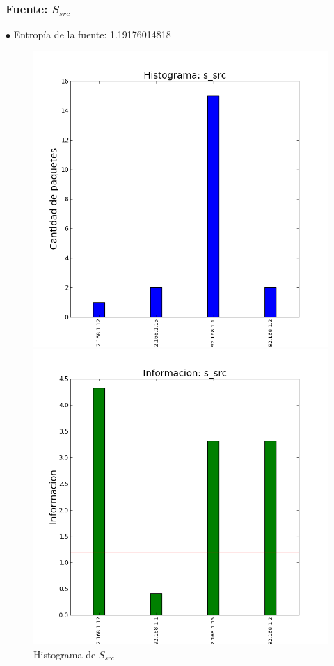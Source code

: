 \documentclass[10pt, a4paper]{article}
\begin{document}
\subsubsection{Fuente: $S_{src}$}

$\bullet$ Entropía de la fuente: 1.19176014818

\begin{figure}[H]
  \begin{minipage}{0.5\linewidth}
    \includegraphics[width=\linewidth]{../imgs/pruebaFede-ips_s_src_hist.png}
    \caption{Histograma de $S_{src}$}\label{fig:Fede-src-hist}
  \end{minipage}
\hfill
  \begin{minipage}{0.5\linewidth}
    \includegraphics[width=\linewidth]{../imgs/pruebaFede-ips_s_src_info.png}

\end{minipage}
\end{figure}
\end{document}
